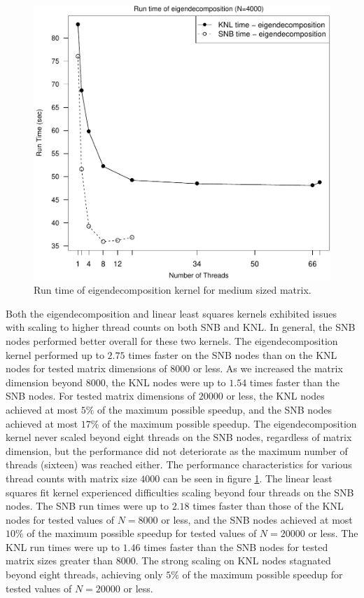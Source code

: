 \begin{figure}
\includegraphics[height=\columnwidth, width=\columnwidth]{eigen_4000_68-rt.pdf}
\caption{Run time of eigendecomposition kernel for medium sized matrix.}
\label{fig:mediumEigenTime}
\end{figure}

Both the eigendecomposition and linear least squares kernels exhibited issues with scaling
to higher thread counts on both SNB and KNL. In general, the SNB nodes performed better
overall for these two kernels. The eigendecomposition kernel performed up to $2.75$ times
faster on the SNB nodes than on the KNL nodes for tested matrix dimensions of $8000$ or
less. As we increased the matrix dimension beyond $8000$, the KNL nodes were up to $1.54$
times faster than the SNB nodes. For tested matrix dimensions of $20000$ or less, the KNL
nodes achieved at most $5\%$ of the maximum possible speedup, and the SNB nodes achieved
at most $17\%$ of the maximum possible speedup. The eigendecomposition kernel never scaled
beyond eight threads on the SNB nodes, regardless of matrix dimension, but the performance
did not deteriorate as the maximum number of threads (sixteen) was reached either. The
performance characteristics for various thread counts with matrix size $4000$ can be seen
in figure \ref{fig:mediumEigenTime}. The linear least squares fit kernel experienced
difficulties scaling beyond four threads on the SNB nodes. The SNB run times were up to
$2.18$ times faster than those of the KNL nodes for tested values of $N=8000$ or less, and
the SNB nodes achieved at most $10\%$ of the maximum possible speedup for tested values of
$N=20000$ or less. The KNL run times were up to $1.46$ times faster than the SNB nodes for
tested matrix sizes greater than $8000$. The strong scaling on KNL nodes stagnated beyond
eight threads, achieving only $5\%$ of the maximum possible speedup for tested values of
$N=20000$ or less.

